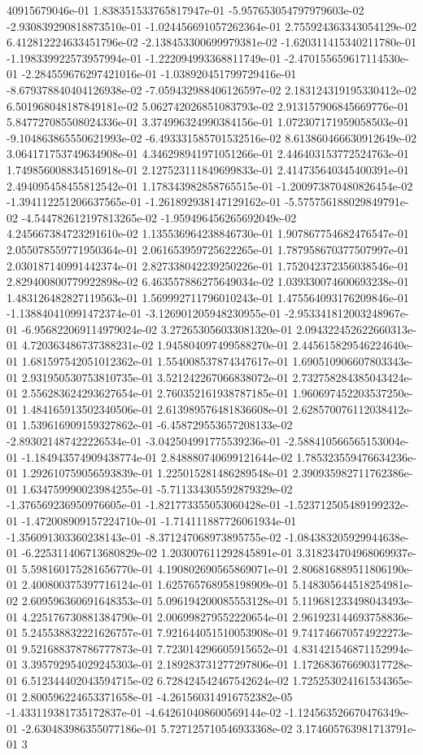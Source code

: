 40915679046e-01	1.838351533765817947e-01	-5.957653054797979603e-02	-2.930839290818873510e-01	-1.024456691057262364e-01	2.755924363343054129e-02	6.412812224633451796e-02	-2.138453300699979381e-02	-1.620311415340211780e-01	-1.198339922573957994e-01	-1.222094993368811749e-01	-2.470155659617114530e-01	-2.284559676297421016e-01	-1.038920451799729416e-01	-8.679378840404126938e-02	-7.059432988406126597e-02	2.183124319195330412e-02	6.501968048187849181e-02	5.062742026851083793e-02	2.913157906845669776e-01	5.847727085508024336e-01	3.374996324990384156e-01	1.072307171959058503e-01	-9.104863865550621993e-02	-6.493331585701532516e-02	8.613860466630912649e-02	3.064171753749634908e-01	4.346298941971051266e-01	2.446403153772524763e-01	1.749856008834516918e-01	2.127523111849699833e-01	2.414735640345400391e-01	2.494095458455812542e-01	1.178343982858765515e-01	-1.200973870480826454e-02	-1.394112251206637565e-01	-1.261892938147129162e-01	-5.575756188029849791e-02	-4.544782612197813265e-02	-1.959496456265692049e-02	4.245667384723291610e-02	1.135536964238846730e-01	1.907867754682476547e-01	2.055078559771950364e-01	2.061653959725622265e-01	1.787958670377507997e-01	2.030187140991442374e-01	2.827338042239250226e-01	1.752042372356038546e-01	2.829400800779922898e-02	6.463557886275649034e-02	1.039330074600693238e-01	1.483126482827119563e-01	1.569992711796010243e-01	1.475564093176209846e-01	-1.138840410991472374e-01	-3.126901205948230955e-01	-2.953341812003248967e-01	-6.956822069114979024e-02	3.272653056033081320e-01	2.094322452622660313e-01	4.720363486737388231e-02	1.945804097499588270e-01	2.445615829546224640e-01	1.681597542051012362e-01	1.554008537874347617e-01	1.690510906607803343e-01	2.931950530753810735e-01	3.521242267066838072e-01	2.732758284385043424e-01	2.556283624293627654e-01	2.760352161938787185e-01	1.960697452203537250e-01	1.484165913502340506e-01	2.613989576481836608e-01	2.628570076112038412e-01	1.539616909159327862e-01	-6.458729553657208133e-02	-2.893021487422226534e-01	-3.042504991775539236e-01	-2.588410566565153004e-01	-1.184943574909438774e-01	2.848880740699121644e-02	1.785323559476634236e-01	1.292610759056593839e-01	1.225015281486289548e-01	2.390935982711762386e-01	1.634759990023984255e-01	-5.711334305592879329e-02	-1.376569236950976605e-01	-1.821773355053060428e-01	-1.523712505489199232e-01	-1.472008909157224710e-01	-1.714111887726061934e-01	-1.356091303360238143e-01	-8.371247068973895755e-02	-1.084383205929944638e-01	-6.225311406713680829e-02	1.203007611292845891e-01	3.318234704968069937e-01	5.598160175281656770e-01	4.190802690565869071e-01	2.806816889511806190e-01	2.400800375397716124e-01	1.625765768958198909e-01	5.148305644518254981e-02	2.609596360691648353e-01	5.096194200085553128e-01	5.119681233498043493e-01	4.225176730881384790e-01	2.006998279552220654e-01	2.961923144693758836e-01	5.245538832221626757e-01	7.921644051510053908e-01	9.741746670574922273e-01	9.521688378786777873e-01	7.723014296605915652e-01	4.831421546871152994e-01	3.395792954029245303e-01	2.189283731277297806e-01	1.172683676690317728e-01	6.512344402043594715e-02	6.728424542467542624e-02	1.725253024161534365e-01	2.800596224653371658e-01	-4.261560314916752382e-05	-1.433119381735172837e-01	-4.642610408600569144e-02	-1.124563526670476349e-01	-2.630483986355077186e-01	5.727125710546933368e-02	3.174605763981713791e-01	3